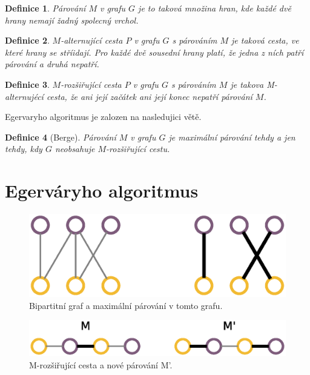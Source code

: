 \documentclass[a4paper, 11pt, titlepage, final]{article}[3. prosinec 2011]
\newtheorem{Definice}{Definice}
\begin{document}
\begin{Definice}
\textit{Párování} $M$ v grafu $G$ je to taková množina hran, kde každé dvě hrany nemají žadný spolecný vrchol.
\end{Definice}

\begin{Definice}
\textit{$M$-alternující cesta} $P$ v grafu $G$ s párováním $M$ je taková cesta, ve které hrany se stříidají. Pro každé dvě sousední hrany platí, že jedna z ních patří párování a druhá nepatří.
\end{Definice}

\begin{Definice}
\textit{$M$-rozšiřující cesta} $P$ v grafu $G$ s párováním $M$ je takova M-alternujécí cesta, že ani její začátek ani její konec nepatří párování $M$.
\end{Definice}

Egervaryho algoritmus je zalozen na nasledujici větě.

\begin{Definice}[Berge]
Párování $M$ v grafu $G$ je maximální párování tehdy a jen tehdy, kdy $G$ neobsahuje $M$-rozšiřující cestu. 
\end{Definice}

\section{Egerváryho algoritmus} \label{secEgervary}


\begin{figure}[ht]
  \centering
  \includegraphics[scale=0.5]{img/bipartite.eps}
  \caption{Bipartitní graf a maximální párování v tomto grafu.}
  \label{imgBipartite}
\end{figure}

\begin{figure}[ht]
  \centering
  \includegraphics[scale=0.5]{img/mpath.eps}
  \caption{M-rozšiřující cesta a nové párování M'.}
  \label{imgPath}
\end{figure}
\end{document}

